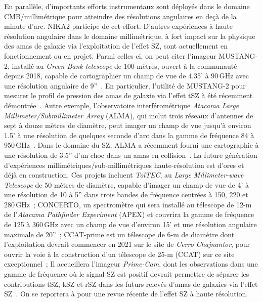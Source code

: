 En parallèle, d'importants efforts instrumentaux sont déployés dans le
domaine CMB/millimétrique pour atteindre des résolutions angulaires en
deçà de la minute d'arc. NIKA2 participe de cet effort. D'autres
expériences à haute résolution angulaire dans le domaine
millimétrique, à fort impact sur la physique des amas
de galaxie via l'exploitation de l'effet SZ, sont actuellement en
fonctionnement ou en projet. Parmi celles-ci, on peut citer l'imageur
MUSTANG-2, installé au \emph{Green Bank telescope} de 100 mètres,
ouvert à la communauté depuis 2018, capable de cartographier un champ
de vue de 4.35’ à 90\,GHz avec une résolution angulaire de
9''~\citep{Dicker2014_MUSTANG2, Stanchfield2016_MUSTANG2}. En
particulier, l'utilité de MUSTANG-2 pour mesurer le profil de
pression des amas de galaxie via l'effet tSZ à été récemment
démontrée~\citep{Romero2019_SZ}.
Autre exemple, l'observatoire interférométrique \emph{Atacama Large
  Millimeter/Submillimeter Array} (ALMA), qui inclut trois réseaux
d'antennes de sept à douze mètres de diamètre, peut imager un champ de
vue jusqu'à environ 1.5' à une résolution de quelques seconde d'arc
dans la gamme de fréquence 84 à 950\,GHz~\citep{ALMA2008, Iguchi2009}.
Dans le domaine du SZ, ALMA a récemment fourni une cartographie à une
résolution de 3.5'' d'un choc dans un amas en
collision~\citep{Basu2016}. La future génération d'expériences
millimétriques/sub-millimétriques haute-résolution est d'ores et déjà en
construction. Ces projets incluent \emph{TolTEC}, au
\emph{Large Millimeter-wave Telescope} de 50 mètres de diamètre,
capable d'imager un champ de vue de 4' à une résolution de 10 à 5''
dans trois bandes de fréquence centrées à 150, 220 et
280\,GHz~\citet{bryan_optical_2018}; CONCERTO, un spectromètre qui
sera installé au télescope de 12-m de l'\emph{Atacama Pathfinder
  Experiment} (APEX) et couvrira la gamme de
fréquence de 125 à 360\,GHz avec un champ de vue d'environ 15' et une
résolution angulaire maximale de 20''~\citep{Lagache2018}; 
CCAT-prime est un télescope de 6-m de diamètre dont l'exploitation
devrait commencer en 2021 sur le site de \emph{Cerro Chajnantor}, pour
ouvrir la voie à la construction d'un télescope de 25-m (CCAT) sur ce
site exceptionnel~\citep{Stacey2018}; Il accueillera l'imageur
\emph{Prime-Cam}, dont les observations dans une gamme de fréquence où
le signal SZ est positif devrait permettre de séparer les contributions
tSZ, kSZ et rSZ dans les futurs relevés d'amas de
galaxies via l'effet SZ~\citep{Mittal2018}. On se reportera à
\citet{Tony2019} pour une revue récente de l'effet SZ à haute
résolution.

